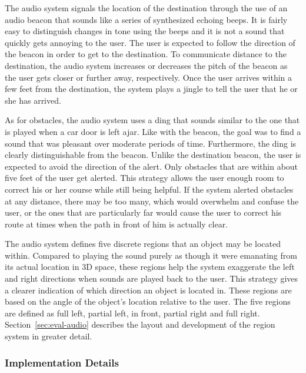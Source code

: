 The audio system signals the location of the destination through the use of an
audio beacon that sounds like a series of synthesized echoing beeps. It is fairly
easy to distinguish changes in tone using the beeps and it is not a sound that
quickly gets annoying to the user. The user is expected to follow the direction
of the beacon in order to get to the destination. To communicate distance to the
destination, the audio system increases or decreases the pitch of the beacon as 
the user gets closer or further away, respectively. Once the user arrives within
a few feet from the destination, the system plays a jingle to tell the user that 
he or she has arrived. 

As for obstacles, the audio system uses a ding that sounds similar
to the one that is played when a car door is left ajar. Like with the beacon, 
the goal was to find a sound that was pleasant over moderate periods of time. 
Furthermore, the ding is clearly distinguishable from the beacon. Unlike the
destination beacon, the user is expected to
avoid the direction of the alert. Only obstacles that are within about five feet of the user get alerted.
This strategy allows the user enough room to correct his or her course while 
still being helpful. If the system alerted obstacles at any distance, there may be 
too many, which would overwhelm and confuse the user, or the ones that are 
particularly far would cause the user to correct his route at times when the 
path in front of him is actually clear.

The audio system defines five discrete regions that an object may be located 
within. Compared to playing the sound purely as though it were emanating from 
its actual location in 3D space, these regions help the system exaggerate the 
left and right directions when sounds are played back to the user.  This 
strategy gives a clearer indication of which direction an object is located in.
These regions are based on the angle of the object's location relative to the 
user. The five regions are defined as full left, partial left, in front, partial 
right and full right. Section~\ref{sec:eval-audio} describes the layout and 
development of the region system in greater detail.

\subsubsection{Implementation Details}
\label{sec:technical-audio-impl}

